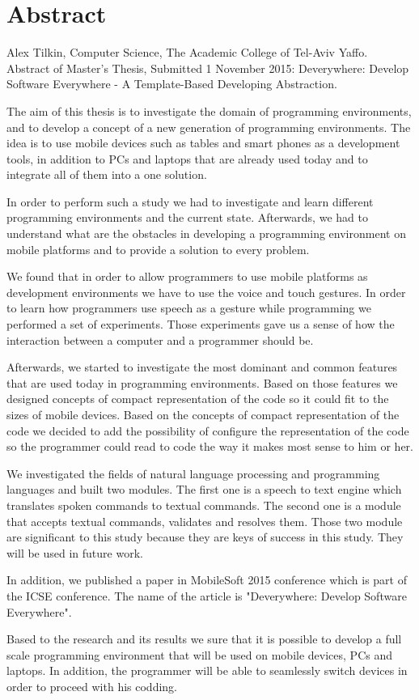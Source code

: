 \section*{Abstract}
Alex Tilkin, Computer Science, The Academic College of Tel-Aviv Yaffo.\\
Abstract of Master’s Thesis, Submitted 1 November 2015:
Deverywhere: Develop Software Everywhere - A Template-Based Developing Abstraction.

The aim of this thesis is to investigate the domain of programming environments, and to develop a concept of a new generation of programming environments. The idea is to use mobile devices such as tables and smart phones as a development tools, in addition to PCs and laptops that are already used today and to integrate all of them into a one solution.

In order to perform such a study we had to investigate and learn different programming environments and the current state. Afterwards, we had to understand what are the obstacles in developing a programming environment on mobile platforms and to provide a solution to every problem. 

We found that in order to allow programmers to use mobile platforms as development environments we have to use the voice and touch gestures. In order to learn how programmers use speech as a gesture while programming we performed a set of experiments. Those experiments gave us a sense of how the interaction between a computer and a programmer should be.

Afterwards, we started to investigate the most dominant and common features that are used today in programming environments. Based on those features we designed concepts of compact representation of the code so it could fit to the sizes of mobile devices. Based on the concepts of compact representation of the code we decided to add the possibility of configure the representation of the code so the programmer could read to code the way it makes most sense to him or her.

We investigated the fields of natural language processing and programming languages and built two modules. The first one is a speech to text engine which translates spoken commands to textual commands. The second one is a module that accepts textual commands, validates and resolves them. Those two module are significant to this study because they are keys of success in this study. They will be used in future work.

In addition, we published a paper in MobileSoft 2015 conference which is part of the ICSE conference. The name of the article is "Deverywhere: Develop Software Everywhere".

Based to the research and its results we sure that it is possible to develop a full scale programming environment that will be used on mobile devices, PCs and laptops. In addition, the programmer will be able to seamlessly switch devices in order to proceed with his codding.